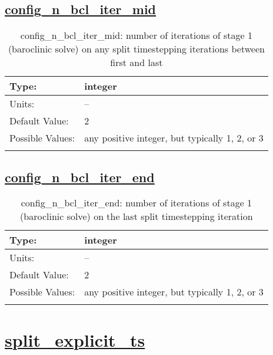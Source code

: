 \subsection[config\_n\_bcl\_iter\_mid]{\hyperref[sec:nm_tab_split_timestep_share]{config\_n\_bcl\_iter\_mid}}
\label{subsec:nm_sec_config_n_bcl_iter_mid}
\begin{center}
\begin{longtable}{| p{2.0in} || p{4.0in} |}
    \hline
    Type: & integer \\
    \hline
    Units: & -- \\
    \hline
    Default Value: & 2 \\
    \hline
    Possible Values: & any positive integer, but typically 1, 2, or 3 \\
    \hline
    \caption{config\_n\_bcl\_iter\_mid: number of iterations of stage 1 (baroclinic solve) on any split timestepping iterations between first and last}
\end{longtable}
\end{center}
\subsection[config\_n\_bcl\_iter\_end]{\hyperref[sec:nm_tab_split_timestep_share]{config\_n\_bcl\_iter\_end}}
\label{subsec:nm_sec_config_n_bcl_iter_end}
\begin{center}
\begin{longtable}{| p{2.0in} || p{4.0in} |}
    \hline
    Type: & integer \\
    \hline
    Units: & -- \\
    \hline
    Default Value: & 2 \\
    \hline
    Possible Values: & any positive integer, but typically 1, 2, or 3 \\
    \hline
    \caption{config\_n\_bcl\_iter\_end: number of iterations of stage 1 (baroclinic solve) on the last split timestepping iteration}
\end{longtable}
\end{center}
\section[split\_explicit\_ts]{\hyperref[sec:nm_tab_split_explicit_ts]{split\_explicit\_ts}}
\label{sec:nm_sec_split_explicit_ts}
